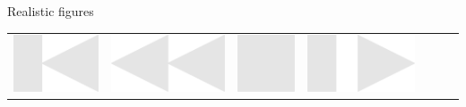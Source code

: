 \documentclass[14pt]{beamer}
\begin{document}
\begin{frame}{Realistic figures}
\begin{center}
{            \begin{tabular}{ccccccc}
                \includegraphics[scale=0.1]{figures/figure026o.pdf} &
                \includegraphics[scale=0.1]{figures/figure026i.pdf} &
                \includegraphics[scale=0.1]{figures/figure026m.pdf} &
                \includegraphics[scale=0.1]{figures/figure026j.pdf} &

\end{tabular}}
\end{center}
\end{frame}
\end{document}
